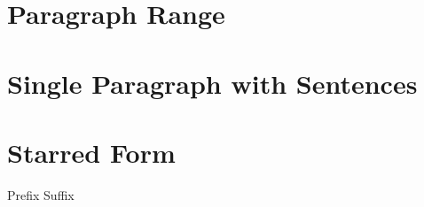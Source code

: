 \documentclass{article}
\begin{document}
\section{Paragraph Range}
\lipsum[1-2]

\section{Single Paragraph with Sentences}
\lipsum[1][1-2]

\section{Starred Form}
Prefix \lipsum*[3] Suffix
\end{document}
